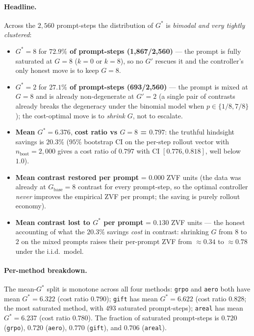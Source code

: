 \documentclass{article}
\begin{document}
\paragraph{Headline.}
Across the $2{,}560$ prompt-steps the distribution of $G^*$ is
\emph{bimodal and very tightly clustered}:
\begin{itemize}
\item $G^* = 8$ for \textbf{$72.9\%$ of prompt-steps (1{,}867/2{,}560)} ---
the prompt is fully saturated at $G{=}8$ ($k = 0$ or $k = 8$), so no
$G'$ rescues it and the controller's only honest move is to keep $G = 8$.
\item $G^* = 2$ for \textbf{$27.1\%$ of prompt-steps (693/2{,}560)} ---
the prompt is mixed at $G{=}8$ and is already non-degenerate at
$G' = 2$ (a single pair of contrasts already breaks the degeneracy
under the binomial model when $p \in \{1/8, 7/8\}$); the cost-optimal
move is to \emph{shrink $G$}, not to escalate.
\item \textbf{Mean $G^* = 6.376$}, \textbf{cost ratio vs $G{=}8$ =
$0.797$}: the truthful hindsight savings is $20.3\%$
($95\%$ bootstrap CI on the per-step rollout vector with
$n_\text{boot}=2{,}000$ gives a cost ratio of $0.797$ with CI
$[0.776, 0.818]$, well below $1.0$).
\item \textbf{Mean contrast restored per prompt} = $0.000$ ZVF units
(the data was already at $G_\text{base}{=}8$ contrast for every
prompt-step, so the optimal controller \emph{never} improves the
empirical ZVF per prompt; the saving is purely rollout economy).
\item \textbf{Mean contrast lost to $G^*$ per prompt} = $0.130$ ZVF
units --- the honest accounting of what the $20.3\%$ savings
\emph{cost} in contrast: shrinking $G$ from $8$ to $2$ on the mixed
prompts raises their per-prompt ZVF from $\approx 0.34$ to
$\approx 0.78$ under the i.i.d.\ model.
\end{itemize}

\paragraph{Per-method breakdown.}
The mean-$G^*$ split is monotone across all four methods:
\texttt{grpo} and \texttt{aero} both have mean $G^*=6.322$
(cost ratio $0.790$); \texttt{gift} has mean $G^* = 6.622$ (cost
ratio $0.828$; the most saturated method, with $493$ saturated
prompt-steps); \texttt{areal} has mean $G^* = 6.237$
(cost ratio $0.780$). The fraction of saturated prompt-steps is
$0.720$ (\texttt{grpo}), $0.720$ (\texttt{aero}), $0.770$
(\texttt{gift}), and $0.706$ (\texttt{areal}).
\end{document}

